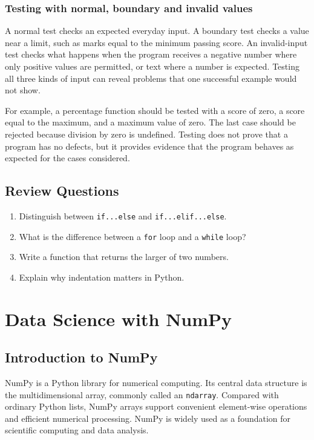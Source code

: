 \documentclass[11pt,openany,oneside]{book}
\begin{document}
\subsection{Testing with normal, boundary and invalid values}
A normal test checks an expected everyday input. A boundary test checks a value near a limit, such as marks equal to the minimum passing score. An invalid-input test checks what happens when the program receives a negative number where only positive values are permitted, or text where a number is expected. Testing all three kinds of input can reveal problems that one successful example would not show.

For example, a percentage function should be tested with a score of zero, a score equal to the maximum, and a maximum value of zero. The last case should be rejected because division by zero is undefined. Testing does not prove that a program has no defects, but it provides evidence that the program behaves as expected for the cases considered.

\section*{Review Questions}
\begin{enumerate}
\item Distinguish between \texttt{if...else} and \texttt{if...elif...else}.
\item What is the difference between a \texttt{for} loop and a \texttt{while} loop?
\item Write a function that returns the larger of two numbers.
\item Explain why indentation matters in Python.
\end{enumerate}

\chapter{Data Science with NumPy}
\section{Introduction to NumPy}
NumPy is a Python library for numerical computing. Its central data structure is the multidimensional array, commonly called an \texttt{ndarray}. Compared with ordinary Python lists, NumPy arrays support convenient element-wise operations and efficient numerical processing. NumPy is widely used as a foundation for scientific computing and data analysis.
\end{document}
